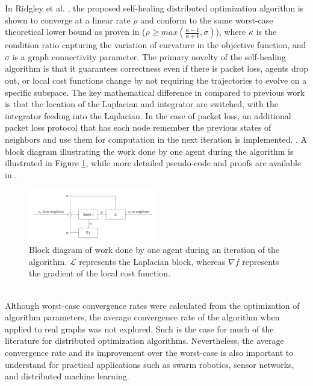 \documentclass[conference]{IEEEtran}
\begin{document}
In Ridgley et al. \autocite{ridgleySelfHealingFirstOrderDistributed2021}, 
the proposed self-healing distributed optimization algorithm is shown to converge 
at a linear rate $\rho$ and conform to the same worst-case theoretical lower bound as proven in
\autocite{sundararajanAnalysisDesignFirstOrder2020} ($\rho \geq max(\frac{\kappa-1}{\kappa+1},\sigma)$), where $\kappa$ is the condition ratio capturing the variation of curvature in the objective function, and $\sigma$ is a graph connectivity parameter.
The primary novelty of the self-healing algorithm is that it guarantees correctness even if
there is packet loss, agents drop out, or local cost functions change by not requiring the 
trajectories to evolve on a specific subspace. The key mathematical difference in \autocite{ridgleySelfHealingFirstOrderDistributed2021} compared to
previous work is that the location of the Laplacian and integrator are switched, with the integrator feeding into the Laplacian. In the case of
packet loss, an additional packet loss protocol that has each node 
remember the previous states of neighbors and use them for computation in the next iteration is implemented. \autocite{ridgleySelfHealingFirstOrderDistributed2021}. 
A block diagram illustrating the work done by one agent during the algorithm is illustrated in Figure \ref{fig:agent_block_diagram}, while more detailed pseudo-code and proofs are available in \autocite{ridgleySelfHealingFirstOrderDistributed2021}.
\\
\begin {figure}[h]
    \centering
    \includegraphics[width=0.5\textwidth]{agent_block_diagram.png}
    \caption{Block diagram of work done by one agent during an iteration of the algorithm. $\mathcal{L}$ represents the Laplacian block, whereas
    $\nabla f$ represents the gradient of the local cost function. }
    \label{fig:agent_block_diagram}
\end{figure}
\\

Although worst-case convergence rates were calculated from the optimization of algorithm parameters, 
the average convergence rate of the algorithm when applied to real graphs was not explored. 
Such is the case for much of the literature for distributed optimization algorithms. Nevertheless, the average convergence rate
and its improvement over the worst-case is also important to understand for practical 
applications such as swarm robotics, sensor networks, and distributed machine learning. 
\end{document}
